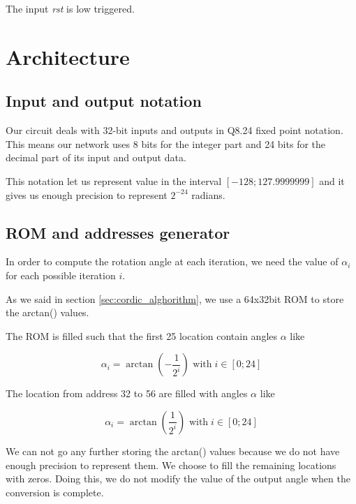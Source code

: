 \documentclass[12pt,a4paper]{report}
\begin{document}
The input \emph{rst} is low triggered.


\chapter{Architecture}

\section{Input and output notation}
Our circuit deals with 32-bit inputs and outputs in Q8.24 fixed point notation. This means our network uses 8 bits for the integer part and 24 bits for the decimal part of its input and output data.

This notation let us represent value in the interval $ \left[ -128; 127.9999999 \right]$ and it gives us enough precision to represent $2^{-24}$ radians.

\section{ROM and addresses generator}
In order to compute the rotation angle at each iteration, we need the value of $\alpha_{i}$ for each possible iteration $i$.

As we said in section \ref{sec:cordic_alghorithm}, we use a 64x32bit ROM to store the arctan() values.

The ROM is filled such that the first 25 location contain angles $\alpha$ like

\begin{equation}
\alpha_{i} = \arctan \left( - \dfrac{1}{2^{i}} \right) \mbox{ with} \; i \in \left[0; 24 \right]
\end{equation}

The location from address 32 to 56 are filled with angles $\alpha$ like

\begin{equation}
\alpha_{i} = \arctan \left(\dfrac{1}{2^{i}} \right) \mbox{ with} \; i \in \left[0; 24 \right]
\end{equation}

We can not go any further storing the arctan() values because we do not have enough precision to represent them. We choose to fill the remaining locations with zeros. Doing this, we do not modify the value of the output angle when the conversion is complete.
\end{document}
